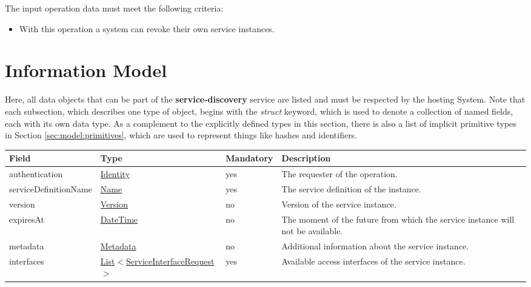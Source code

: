 \documentclass[a4paper]{arrowhead}
\newcommand{\pref}[1]{{\textcolor{ArrowheadGrey}{\hyperref[sec:model:primitives:#1]{#1}}}}
\begin{document}

The input operation data must meet the following criteria:

\begin{itemize}
    \item With this operation a system can revoke their own service instances.
\end{itemize}

\clearpage

\section{Information Model}
\label{sec:model}

Here, all data objects that can be part of the \textbf{service-discovery} service are listed and must be respected by the hosting System.
Note that each subsection, which describes one type of object, begins with the \textit{struct} keyword, which is used to denote a collection of named fields, each with its own data type.
As a complement to the explicitly defined types in this section, there is also a list of implicit primitive types in Section \ref{sec:model:primitives}, which are used to represent things like hashes and identifiers.

{}
 
\begin{table}[ht!]
\begin{tabularx}{\textwidth}{| p{3.6cm} | p{4.9cm} | p{2cm} | X |} \hline
\rowcolor{gray!33} Field & Type & Mandatory & Description \\ \hline
authentication & \hyperref[sec:model:Identity]{Identity} & yes & The requester of the operation. \\ \hline
serviceDefinitionName & \pref{Name} & yes & The service definition of the instance. \\ \hline
version & \pref{Version} & no & Version of the service instance. \\ \hline
expiresAt & \pref{DateTime} & no & The moment of the future from which the service instance will not be available. \\ \hline
metadata &\hyperref[sec:model:Metadata]{Metadata} & no & Additional information about the service instance. \\ \hline
interfaces &  \pref{List}$<$\hyperref[sec:model:ServiceInterfaceRequest]{ServiceInterfaceRequest}$>$ & yes & Available access interfaces of the service instance.  \\ \hline
\end{tabularx}
\end{table}
\end{document}
